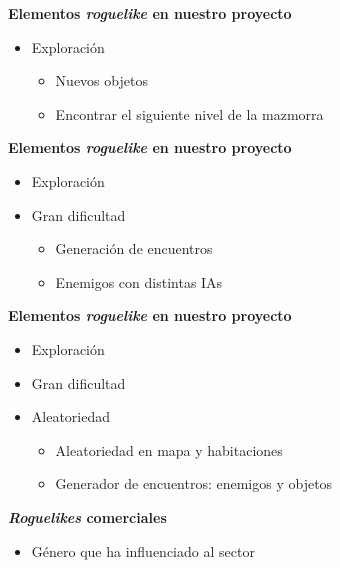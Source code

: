 
\begin{tframe}{\textbf{Elementos \textit{roguelike} en nuestro proyecto}}
	\begin{itemize}
		\item<+-| alert@+> Exploración
			\begin{itemize}
				\item Nuevos objetos
				\item Encontrar el siguiente nivel de la mazmorra
			\end{itemize}
	\end{itemize}
\end{tframe}

\begin{tframe}{\textbf{Elementos \textit{roguelike} en nuestro proyecto}}
	\begin{itemize}
		\item Exploración
		\item<+-| alert@+> Gran dificultad
		\begin{itemize}
			\item Generación de encuentros
			\item Enemigos con distintas IAs
		\end{itemize}
	\end{itemize}
\end{tframe}

\begin{tframe}{\textbf{Elementos \textit{roguelike} en nuestro proyecto}}
	\begin{itemize}
		\item Exploración
		\item Gran dificultad
		\item<+-| alert@+> Aleatoriedad
		\begin{itemize}
			\item Aleatoriedad en mapa y habitaciones
			\item Generador de encuentros: enemigos y objetos
		\end{itemize}
	\end{itemize}
\end{tframe}


\begin{tframe}{\textbf{\textit{Roguelikes} comerciales}}
	\begin{itemize}
		\item<+-| alert@+> Género que ha influenciado al sector
	\end{itemize}
\end{tframe}

